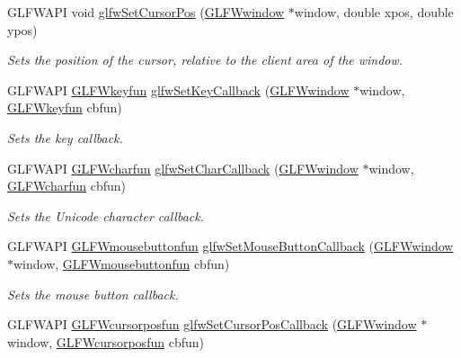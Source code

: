 \begin{DoxyCompactItemize}
\-G\-L\-F\-W\-A\-P\-I void \hyperlink{group__input_gaaf152cc93418acb0ba342e3f4af922bc}{glfw\-Set\-Cursor\-Pos} (\hyperlink{group__window_ga3c96d80d363e67d13a41b5d1821f3242}{\-G\-L\-F\-Wwindow} $\ast$window, double xpos, double ypos)
\begin{DoxyCompactList}\small\item\em \-Sets the position of the cursor, relative to the client area of the window. \end{DoxyCompactList}\item 
\-G\-L\-F\-W\-A\-P\-I \hyperlink{group__input_ga592dd1919f8a1dc7576b13cdd8b7b695}{\-G\-L\-F\-Wkeyfun} \hyperlink{group__input_gaa73bb92f628a2a0be9c132d56f19362c}{glfw\-Set\-Key\-Callback} (\hyperlink{group__window_ga3c96d80d363e67d13a41b5d1821f3242}{\-G\-L\-F\-Wwindow} $\ast$window, \hyperlink{group__input_ga592dd1919f8a1dc7576b13cdd8b7b695}{\-G\-L\-F\-Wkeyfun} cbfun)
\begin{DoxyCompactList}\small\item\em \-Sets the key callback. \end{DoxyCompactList}\item 
\-G\-L\-F\-W\-A\-P\-I \hyperlink{group__input_ga1103f1876518acecb5976f6b307c51d1}{\-G\-L\-F\-Wcharfun} \hyperlink{group__input_ga07b2959b23dc3e466ce7475746021002}{glfw\-Set\-Char\-Callback} (\hyperlink{group__window_ga3c96d80d363e67d13a41b5d1821f3242}{\-G\-L\-F\-Wwindow} $\ast$window, \hyperlink{group__input_ga1103f1876518acecb5976f6b307c51d1}{\-G\-L\-F\-Wcharfun} cbfun)
\begin{DoxyCompactList}\small\item\em \-Sets the \-Unicode character callback. \end{DoxyCompactList}\item 
\-G\-L\-F\-W\-A\-P\-I \hyperlink{group__input_ga1e008c7a8751cea648c8f42cc91104cf}{\-G\-L\-F\-Wmousebuttonfun} \hyperlink{group__input_ga20e5ba1ce4e086aedd48a06dc311c95f}{glfw\-Set\-Mouse\-Button\-Callback} (\hyperlink{group__window_ga3c96d80d363e67d13a41b5d1821f3242}{\-G\-L\-F\-Wwindow} $\ast$window, \hyperlink{group__input_ga1e008c7a8751cea648c8f42cc91104cf}{\-G\-L\-F\-Wmousebuttonfun} cbfun)
\begin{DoxyCompactList}\small\item\em \-Sets the mouse button callback. \end{DoxyCompactList}\item 
\-G\-L\-F\-W\-A\-P\-I \hyperlink{group__input_ga592fbfef76d88f027cb1bc4c36ebd437}{\-G\-L\-F\-Wcursorposfun} \hyperlink{group__input_ga9c49c0d3d3c775c3124726f1d902124d}{glfw\-Set\-Cursor\-Pos\-Callback} (\hyperlink{group__window_ga3c96d80d363e67d13a41b5d1821f3242}{\-G\-L\-F\-Wwindow} $\ast$window, \hyperlink{group__input_ga592fbfef76d88f027cb1bc4c36ebd437}{\-G\-L\-F\-Wcursorposfun} cbfun)

\end{DoxyCompactItemize}
